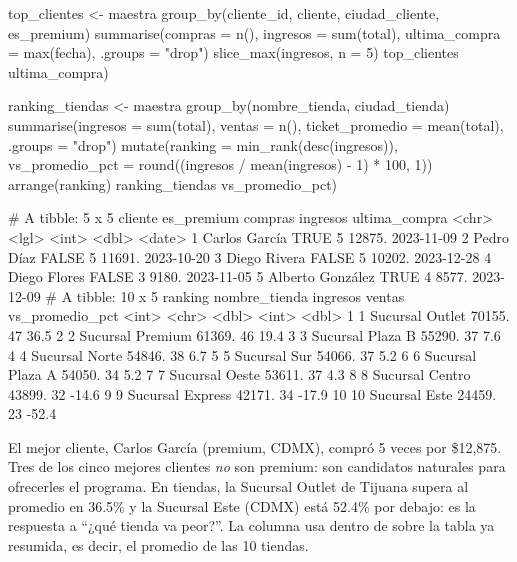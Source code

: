 \begin{rcode}[title=Reporte mensual: top clientes y tiendas]
top_clientes <- maestra %
  group_by(cliente_id, cliente, ciudad_cliente, es_premium) %
  summarise(compras = n(), ingresos = sum(total),
            ultima_compra = max(fecha), .groups = "drop") %
  slice_max(ingresos, n = 5)
top_clientes %
                        ultima_compra)

ranking_tiendas <- maestra %
  group_by(nombre_tienda, ciudad_tienda) %
  summarise(ingresos = sum(total), ventas = n(),
            ticket_promedio = mean(total), .groups = "drop") %
  mutate(ranking = min_rank(desc(ingresos)),
         vs_promedio_pct = round((ingresos / mean(ingresos) - 1) * 100,
                                 1)) %
  arrange(ranking)
ranking_tiendas %
                           vs_promedio_pct)
\end{rcode}
\begin{rsalida}
# A tibble: 5 x 5
  cliente          es_premium compras ingresos ultima_compra
  <chr>            <lgl>        <int>    <dbl> <date>       
1 Carlos García    TRUE             5   12875. 2023-11-09   
2 Pedro Díaz       FALSE            5   11691. 2023-10-20   
3 Diego Rivera     FALSE            5   10202. 2023-12-28   
4 Diego Flores     FALSE            3    9180. 2023-11-05   
5 Alberto González TRUE             4    8577. 2023-12-09   
# A tibble: 10 x 5
   ranking nombre_tienda    ingresos ventas vs_promedio_pct
     <int> <chr>               <dbl>  <int>           <dbl>
 1       1 Sucursal Outlet    70155.     47            36.5
 2       2 Sucursal Premium   61369.     46            19.4
 3       3 Sucursal Plaza B   55290.     37             7.6
 4       4 Sucursal Norte     54846.     38             6.7
 5       5 Sucursal Sur       54066.     37             5.2
 6       6 Sucursal Plaza A   54050.     34             5.2
 7       7 Sucursal Oeste     53611.     37             4.3
 8       8 Sucursal Centro    43899.     32           -14.6
 9       9 Sucursal Express   42171.     34           -17.9
10      10 Sucursal Este      24459.     23           -52.4
\end{rsalida}

El mejor cliente, Carlos García (premium, CDMX), compró 5 veces por
\$12,875. Tres de los cinco mejores clientes \emph{no} son premium: son
candidatos naturales para ofrecerles el programa. En tiendas, la Sucursal
Outlet de Tijuana supera al promedio en 36.5\% y la Sucursal Este (CDMX) está
52.4\% por debajo: es la respuesta a ``¿qué tienda va peor?''. La columna
 usa  dentro de
 sobre la tabla ya resumida, es decir, el promedio de las
10 tiendas.

